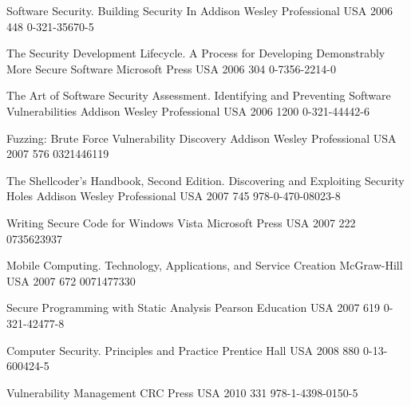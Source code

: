 \begin{thebibliography}{9}
		{}
		{Software Security. Building Security In}
		{}
		{Addison Wesley Professional}
		{USA}
		{2006}
		{448}
		{0-321-35670-5}
	
		{
			\biband
			}
		{The Security Development Lifecycle. A Process for Developing Demonstrably More Secure Software}
		{}
		{Microsoft Press}
		{USA}
		{2006}
		{304}
		{0-7356-2214-0}
	
		{
			\biband
			\biband
			}
		{The Art of Software Security Assessment. Identifying and Preventing Software Vulnerabilities}
		{}
		{Addison Wesley Professional}
		{USA}
		{2006}
		{1200}
		{0-321-44442-6}
	
		{
			\biband
			\biband
			}
		{Fuzzing: Brute Force Vulnerability Discovery}
		{}
		{Addison Wesley Professional}
		{USA}
		{2007}
		{576}
		{0321446119}
	
		{
			\biband
			\biband
			\biband
			}
		{The Shellcoder's Handbook, Second Edition. Discovering and Exploiting Security Holes}
		{}
		{Addison Wesley Professional}
		{USA}
		{2007}
		{745}
		{978-0-470-08023-8}
	
		{
			\biband
			}
		{Writing Secure Code for {W}indows {V}ista}
		{}
		{Microsoft Press}
		{USA}
		{2007}
		{222}
		{0735623937}
	
		{
			\biband
			}
		{Mobile Computing. Technology, Applications, and Service Creation}
		{}
		{McGraw-Hill}
		{USA}
		{2007}
		{672}
		{0071477330}
	
		{}
		{Secure Programming with Static Analysis}
		{}
		{Pearson Education}
		{USA}
		{2007}
		{619}
		{0-321-42477-8}
	
		{
			\biband
			}
		{Computer Security. Principles and Practice}
		{}
		{Prentice Hall}
		{USA}
		{2008}
		{880}
		{0-13-600424-5}
	
		{}
		{Vulnerability Management}
		{}
		{CRC Press}
		{USA}
		{2010}
		{331}
		{978-1-4398-0150-5}
	

\end{thebibliography}
